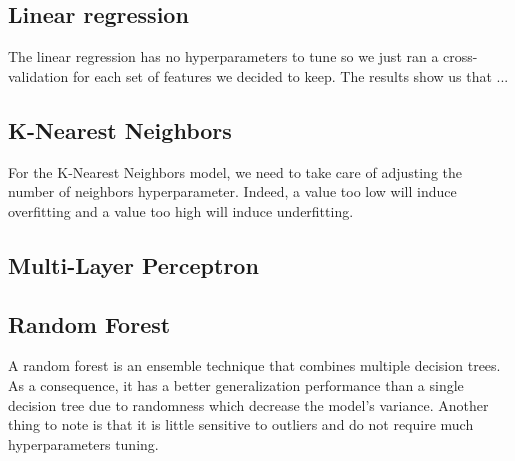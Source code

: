 \subsection{Linear regression}

The linear regression has no hyperparameters to tune so we just ran a cross-validation for each set of features we decided to keep. The results show us that ... 


\subsection{K-Nearest Neighbors}

For the K-Nearest Neighbors model, we need to take care of adjusting the number of neighbors hyperparameter. Indeed, a value too low will induce overfitting and a value too high will induce underfitting. 

\subsection{Multi-Layer Perceptron}

\subsection{Random Forest}

A random forest is an ensemble technique that combines multiple decision trees. As a consequence, it has a better generalization performance than a single decision tree due to randomness which decrease the model's variance. Another thing to note is that it is little sensitive to outliers and do not require much hyperparameters tuning.